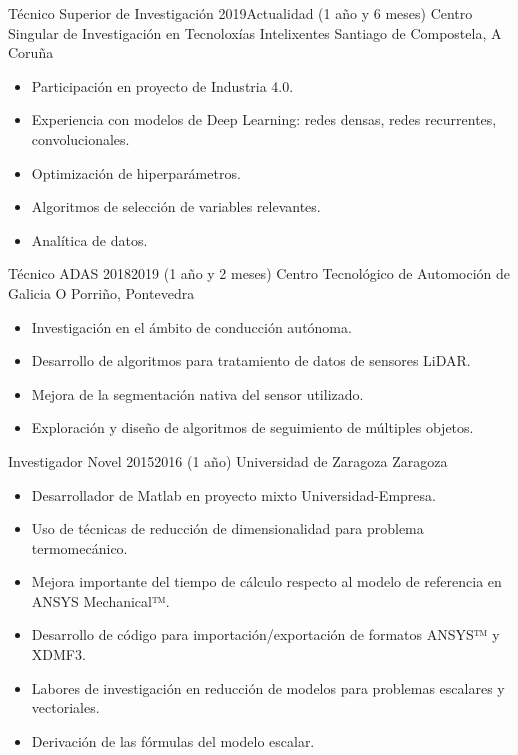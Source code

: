\cvitem
    {Técnico Superior de Investigación}
    {2019}{Actualidad (1 año y 6 meses)}
    {Centro Singular de Investigación en Tecnoloxías Intelixentes}
    {Santiago de Compostela, A Coruña}
\begin{itemize}
  \small
\item Participación en proyecto de Industria 4.0.
\item Experiencia con modelos de Deep Learning: redes densas, redes recurrentes, convolucionales.
\item Optimización de hiperparámetros.
\item Algoritmos de selección de variables relevantes.
\item Analítica de datos.
\end{itemize}


\cvitem
    {Técnico ADAS} %
    {2018}{2019 (1 año y 2 meses)} %
    {Centro Tecnológico de Automoción de Galicia} %
    {O Porriño, Pontevedra} %
\begin{itemize}
    \small
    \item Investigación en el ámbito de conducción autónoma.
    \item Desarrollo de algoritmos para tratamiento de datos de sensores LiDAR.
    \item Mejora de la segmentación nativa del sensor utilizado.
    \item Exploración y diseño de algoritmos de seguimiento de múltiples objetos.
\end{itemize}

\cvitem
    {Investigador Novel} %
    {2015}{2016 (1 año)} %
    {Universidad de Zaragoza} %
    {Zaragoza} %
\begin{itemize}
    \small
    \item Desarrollador de Matlab en proyecto mixto Universidad-Empresa.
    \item Uso de técnicas de reducción de dimensionalidad para problema termomecánico.
    \item Mejora importante del tiempo de cálculo respecto al modelo de referencia en ANSYS Mechanical™.
    \item Desarrollo de código para importación/exportación de formatos ANSYS™ y XDMF3.
    \item Labores de investigación en reducción de modelos para problemas escalares y vectoriales.
    \item Derivación de las fórmulas del modelo escalar.
\end{itemize}

